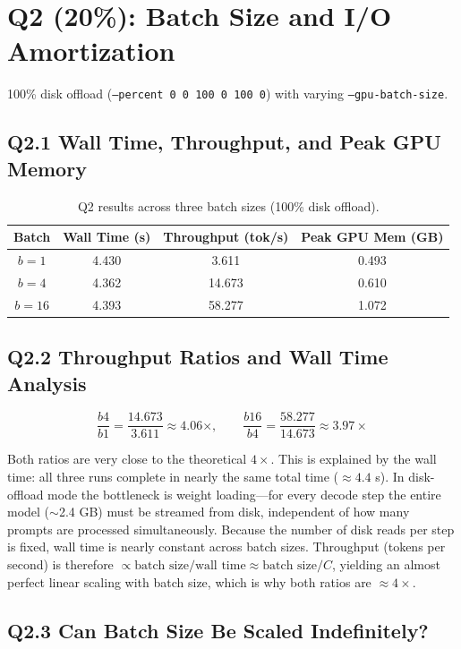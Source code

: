 \documentclass[12pt,a4paper]{article}
\begin{document}
\section{Q2 (20\%): Batch Size and I/O Amortization}

100\% disk offload (\texttt{--percent 0 0 100 0 100 0}) with varying \texttt{--gpu-batch-size}.

\subsection*{Q2.1 Wall Time, Throughput, and Peak GPU Memory}

\begin{table}[H]
\centering
\caption{Q2 results across three batch sizes (100\% disk offload).}
\begin{tabular}{cccc}
\toprule
\textbf{Batch} & \textbf{Wall Time (s)} & \textbf{Throughput (tok/s)} & \textbf{Peak GPU Mem (GB)} \\
\midrule
$b=1$  & 4.430 &  3.611 & 0.493 \\
$b=4$  & 4.362 & 14.673 & 0.610 \\
$b=16$ & 4.393 & 58.277 & 1.072 \\
\bottomrule
\end{tabular}
\end{table}

\subsection*{Q2.2 Throughput Ratios and Wall Time Analysis}

\[
  \frac{b4}{b1} = \frac{14.673}{3.611} \approx 4.06\times, \qquad
  \frac{b16}{b4} = \frac{58.277}{14.673} \approx 3.97\times
\]

Both ratios are very close to the theoretical $4\times$.
This is explained by the wall time: all three runs complete in nearly the same total time ($\approx 4.4$ s).
In disk-offload mode the bottleneck is weight loading---for every decode step the entire model ($\sim$2.4 GB) must be streamed from disk, independent of how many prompts are processed simultaneously.
Because the number of disk reads per step is fixed, wall time is nearly constant across batch sizes.
Throughput (tokens per second) is therefore $\propto \text{batch size} / \text{wall time} \approx \text{batch size} / C$, yielding an almost perfect linear scaling with batch size, which is why both ratios are $\approx 4\times$.

\subsection*{Q2.3 Can Batch Size Be Scaled Indefinitely?}
\end{document}
